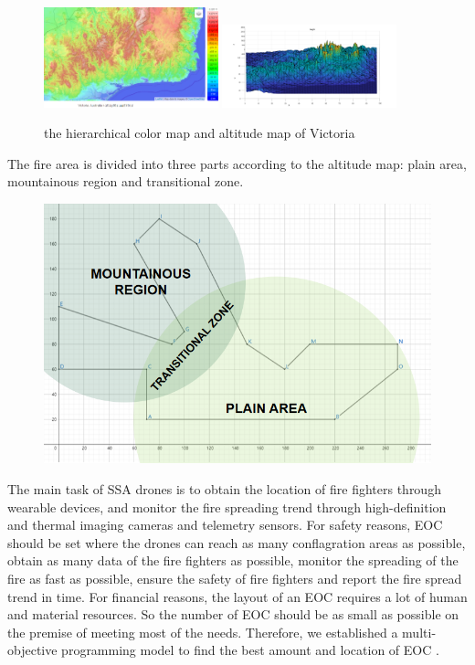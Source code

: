 \documentclass{mcmthesis}
\begin{document}
\begin{figure}[H]
  \centering
  {
  \includegraphics[width=0.45\textwidth]{image/colormap.png} 
  }
  {
  \includegraphics[width=0.45\textwidth]{image/Height.png}
  }
  \caption{the hierarchical color map and altitude map of Victoria}
  \label{png1}
\end{figure}


The fire area is divided into three parts according to the altitude map: plain area, mountainous region and transitional zone.

\begin{figure}[H]
  \centering
  \includegraphics[scale=0.4]{image/4.png}
  
\end{figure}

The main task of SSA drones is to obtain the location of fire fighters through wearable devices, and monitor the fire spreading trend through high-definition and thermal imaging cameras and telemetry sensors. For safety reasons, EOC should be set where the drones can reach as many conflagration areas as possible, obtain as many data of the fire fighters as possible, monitor the spreading of the fire as fast as possible, ensure the safety of fire fighters and report the fire spread trend in time. For financial reasons, the layout of an EOC requires a lot of human and material resources. So the number of EOC should be as small as possible on the premise of meeting most of the needs. Therefore, we established a multi-objective programming model to find the best amount and location of EOC .
\end{document}
